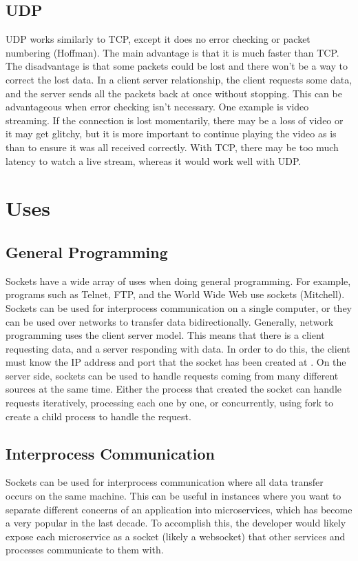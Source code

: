 \documentclass[conference, 12pt]{IEEEtran}
\begin{document}
\subsection{UDP}
UDP works similarly to TCP, except it does no error checking or packet numbering (Hoffman). The main advantage is that it is much faster than TCP. The disadvantage is that some packets could be lost and there won’t be a way to correct the lost data. In a client server relationship, the client requests some data, and the server sends all the packets back at once without stopping. This can be advantageous when error checking isn’t necessary. One example is video streaming. If the connection is lost momentarily, there may be a loss of video or it may get glitchy, but it is more important to continue playing the video as is than to ensure it was all received correctly. With TCP, there may be too much latency to watch a live stream, whereas it would work well with UDP.

\section{Uses}
\subsection{General Programming}
Sockets have a wide array of uses when doing general programming. For example, programs such as Telnet, FTP, and the World Wide Web use sockets (Mitchell). Sockets can be used for interprocess communication on a single computer, or they can be used over networks to transfer data bidirectionally. Generally, network programming uses the client server model. This means that there is a client requesting data, and a server responding with data. In order to do this, the client must know the IP address and port that the socket has been created at \cite{Sawant}. On the server side, sockets can be used to handle requests coming from many different sources at the same time. Either the process that created the socket can handle requests iteratively, processing each one by one, or concurrently, using fork to create a child process to handle the request.

\subsection{Interprocess Communication}
Sockets can be used for interprocess communication where all data transfer occurs on the same machine. This can be useful in instances where you want to separate different concerns of an application into microservices, which has become a very popular in the last decade. To accomplish this, the developer would likely expose each microservice as a socket (likely a websocket) that other services and processes communicate to them with.
\end{document}
